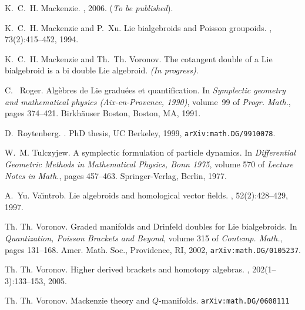 \documentclass[12pt,reqno,a4paper]{amsart}
\theoremstyle{definition}
\begin{document}
\begin{thebibliography}{10}
K.~C.~H. Mackenzie.
, 2006. (\textit{To be published}).

K.~C.~H. Mackenzie and P.~Xu.
\newblock Lie bialgebroids and {P}oisson groupoids.
, 73(2):415--452, 1994.

K.~C.~H. Mackenzie and Th.~Th. Voronov.
\newblock The cotangent double of a {Lie} bialgebroid is a   bi
double {Lie} algebroid.
\newblock \textit{(In progress)}.

C.~ Roger.
\newblock Alg\`ebres de {L}ie gradu\'ees et quantification.
\newblock In {\em Symplectic geometry and mathematical physics
  (Aix-en-Provence, 1990)}, volume~99 of {\em Progr. Math.}, pages 374--421.
  Birkh\"auser Boston, Boston, MA, 1991.

D.~Roytenberg.
.
\newblock PhD thesis, {UC Berkeley}, 1999, \texttt{arXiv:math.DG/9910078}.

W.~M. Tulczyjew.
\newblock A symplectic formulation of particle dynamics.
\newblock In {\em Differential Geometric Methods in Mathematical Physics, Bonn
  1975}, volume 570 of {\em Lecture Notes in Math.}, pages 457--463.
  Springer-Verlag, Berlin, 1977.

A.~Yu. Va{\u\i}ntrob.
\newblock Lie algebroids and homological vector fields.
, 52(2):428--429, 1997.

Th. Th. Voronov.
\newblock Graded manifolds and {Drinfeld} doubles for {Lie} bialgebroids.
\newblock In {\em Quantization, Poisson Brackets and
  Beyond}, volume 315 of {\em Contemp. Math.}, pages 131--168. Amer. Math.
  Soc., Providence, RI, 2002, {\tt arXiv:math.DG/0105237}.

Th. Th. Voronov.
\newblock Higher derived brackets and homotopy algebras.
, 202(1--3):133--153, 2005.

Th.  Th. Voronov.
\newblock Mackenzie
theory and $Q$-manifolds. \texttt{arXiv:math.DG/0608111}

\end{thebibliography}
\end{document}
